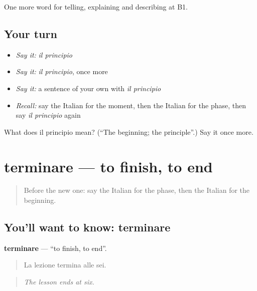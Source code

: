 \begin{grammarlens}[title={What you've built}]
One more word for telling, explaining and describing at B1.
\end{grammarlens}

\subsection*{Your turn}
\begin{itemize}
\raggedright
  \item \emph{Say it:} \emph{il principio}
  \item \emph{Say it:} \emph{il principio}, once more
  \item \emph{Say it:} a sentence of your own with \emph{il principio}
  \item \emph{Recall:} say the Italian for the moment, then the Italian for the phase, then say \emph{il principio} again
\end{itemize}

\begin{tcolorbox}[breakable,colback=teal!4,colframe=teal!35!black,title={Before you move on}]
What does il principio mean? (\textquotedblleft{}The beginning; the principle\textquotedblright{}.) Say it once more.
\end{tcolorbox}
\section[terminare]{terminare — to finish, to end}

\label{lesson:IT-C278-terminare}



\begin{quote}
Before the new one: say the Italian for the phase, then the Italian for the beginning.
\end{quote}

\subsection*{You'll want to know: terminare}
\textbf{terminare} — \textquotedblleft{}to finish, to end\textquotedblright{}.

\begin{quote}
La lezione termina alle sei.
\end{quote}

\begin{quote}
\emph{The lesson ends at six.}
\end{quote}

